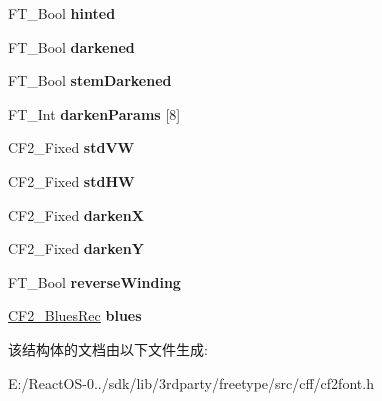 \begin{DoxyCompactItemize}
\mbox{\label{struct_c_f2___font_rec___a5350e8bcab14d7272b47c4ff28b4df45}} 
F\+T\+\_\+\+Bool {\bfseries hinted}
\item 
\mbox{\label{struct_c_f2___font_rec___a62a08410c45ea764289db9ac0a44fb7a}} 
F\+T\+\_\+\+Bool {\bfseries darkened}
\item 
\mbox{\label{struct_c_f2___font_rec___a38c3cfa600be7d8c35b25a1621f231c7}} 
F\+T\+\_\+\+Bool {\bfseries stem\+Darkened}
\item 
\mbox{\label{struct_c_f2___font_rec___a094f67081a57eb766aa9aec3c66365b4}} 
F\+T\+\_\+\+Int {\bfseries darken\+Params} \mbox{[}8\mbox{]}
\item 
\mbox{\label{struct_c_f2___font_rec___a81a93428fb0db026cf049535fedd12e7}} 
C\+F2\+\_\+\+Fixed {\bfseries std\+VW}
\item 
\mbox{\label{struct_c_f2___font_rec___a5ee4f5920a34ecfa4f03ad184b4aacbe}} 
C\+F2\+\_\+\+Fixed {\bfseries std\+HW}
\item 
\mbox{\label{struct_c_f2___font_rec___ae445d09967cdb13ff6c05c41be125ee7}} 
C\+F2\+\_\+\+Fixed {\bfseries darkenX}
\item 
\mbox{\label{struct_c_f2___font_rec___a6ad9bec76418fbdab2ac1411778dba96}} 
C\+F2\+\_\+\+Fixed {\bfseries darkenY}
\item 
\mbox{\label{struct_c_f2___font_rec___a070ad2cfb7942b73ce49a9ee58fe493b}} 
F\+T\+\_\+\+Bool {\bfseries reverse\+Winding}
\item 
\mbox{\label{struct_c_f2___font_rec___a1db6c1f02f84c47fbbf2967b6c58aeba}} 
\hyperlink{struct_c_f2___blues_rec__}{C\+F2\+\_\+\+Blues\+Rec} {\bfseries blues}
\end{DoxyCompactItemize}


该结构体的文档由以下文件生成\+:\begin{DoxyCompactItemize}
\item 
E\+:/\+React\+O\+S-\/0../sdk/lib/3rdparty/freetype/src/cff/cf2font.\+h\end{DoxyCompactItemize}
